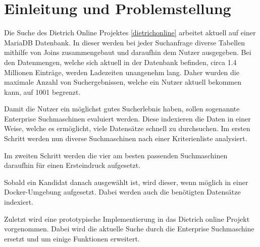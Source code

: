 \chapter{Einleitung und Problemstellung}


Die Suche des Dietrich Online Projektes \ref{dietrichonline} arbeitet aktuell auf einer MariaDB Datenbank. In dieser werden bei jeder Suchanfrage diverse Tabellen mithilfe von Joins zusammengebaut und daraufhin dem Nutzer ausgegeben. Bei den Datenmengen, welche sich aktuell in der Datenbank befinden, circa 1.4 Millionen Einträge, werden Ladezeiten unangenehm lang. Daher wurden die maximale Anzahl von Suchergebnissen, welche ein Nutzer aktuell bekommen kann, auf 1001 begrenzt. 

Damit die Nutzer ein möglichst gutes Sucherlebnis haben, sollen sogenannte Enterprise Suchmaschinen evaluiert werden. Diese indexieren die Daten in einer Weise, welche es ermöglicht, viele Datensätze schnell zu durchsuchen. Im ersten Schritt werden nun diverse Suchmaschinen nach einer Kriterienliste analysiert.

Im zweiten Schritt werden die vier am besten passenden Suchmaschinen daraufhin für einen Ersteindruck aufgesetzt.

Sobald ein Kandidat danach ausgewählt ist, wird dieser, wenn möglich in einer Docker-Umgebung aufgesetzt. Dabei werden auch die benötigten Datensätze indexiert.

Zuletzt wird eine prototypische Implementierung in das Dietrich online Projekt vorgenommen. Dabei wird die aktuelle Suche durch die Enterprise Suchmaschine ersetzt und um einige Funktionen erweitert. 